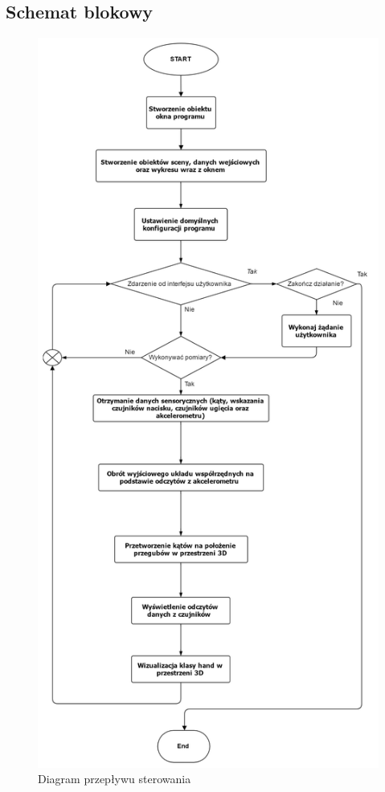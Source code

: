 \documentclass[12pt,a4paper]{article}
\begin{document}
\subsection{Schemat blokowy}
\begin{figure}[!htb]
\centering
\includegraphics[height=0.8\textheight]{./Diagram_przeplywu_sterowania.png}
\caption{Diagram przepływu sterowania}
\end{figure}
\end{document}
